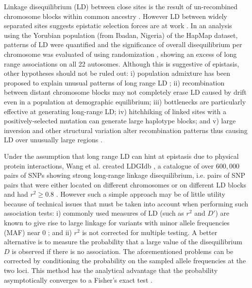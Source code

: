 Linkage disequilibrium (LD) between close sites is the result of un-recombined chromosome blocks within common ancestry \cite{reich2001linkage}.
However LD between widely separated sites suggests epistatic selection forces are at work \cite{fisher1958genetical, koch2013long}.
In an analysis using the Yorubian population (from Ibadan, Nigeria) of the HapMap dataset, patterns of LD were quantified and the significance of overall disequilibrium per chromosome was evaluated of using randomization \cite{koch2013long}, showing an excess of long range associations on all 22 autosomes. 
Although this is suggestive of epistasis, other hypotheses should not be ruled out:
i) population admixture has been proposed to explain unusual patterns of long range LD \cite{price2008long};
ii) recombination between distant chromosome blocks may not completely erase LD caused by drift even in a population at demographic equilibrium;
iii) bottlenecks are particularly effective at generating long-range LD;
iv) hitchhiking of linked sites with a positively-selected mutation can generate large haplotype blocks; and
v) large inversion and other structural variation alter recombination patterns thus causing LD over unusually large regions \cite{bansal2007evidence}.

Under the assumption that long range LD can hint at epistasis due to physical protein interactions, Wang et al. created LDGIdb \cite{wang2012ldgidb}, a catalogue of over $600,000$ pairs of SNPs showing strong long-range linkage disequilibrium, i.e. pairs of SNP pairs that were either located on different chromosomes or on different LD blocks and had $r^2 \ge 0.8$ \cite{wang2012ldgidb}.
However such a simple approach may be of little utility because of technical issues that must be taken into account when performing such association tests: 
i) commonly used measures of LD (such as $r^2$ and $D'$) are known to give rise to large linkage for variants with minor allele frequencies (MAF) near 0 \cite{koch2013long}; and 
ii) $r^2$ is not corrected for multiple testing.
A better alternative is to measure the probability that a large value of the disequilibrium $D$ is observed if there is no association.
The aforementioned problems can be corrected by conditioning the probability on the sampled allele frequencies at the two loci.
This method has the analytical advantage that the probability asymptotically converges to a Fisher's exact test \cite{koch2013long}.

